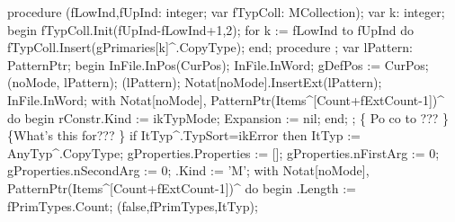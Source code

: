 \nwendcode{}\nwdocspar
\nwenddocs{}\endmoddef\nwstartdeflinemarkup{}\nwenddeflinemarkup
procedure (fLowInd,fUpInd: integer; var fTypColl: MCollection);
var
   k: integer;
begin
   fTypColl.Init(fUpInd-fLowInd+1,2);
   for k := fLowInd to fUpInd do
      fTypColl.Insert(gPrimaries[k]^.CopyType);
end;
\eatline
{}\nwendcode{}\nwdocspar
\nwenddocs{}\endmoddef\nwstartdeflinemarkup{}\nwenddeflinemarkup
procedure ;
var
   lPattern: PatternPtr;
begin
   InFile.InPos(CurPos);
   InFile.InWord;
   gDefPos := CurPos;
   (noMode, lPattern);
   (lPattern);
   Notat[noMode].InsertExt(lPattern);
   InFile.InWord;
   with Notat[noMode], PatternPtr(Items^[Count+fExtCount-1])^ do
   begin
      rConstr.Kind := ikTypMode;
      Expansion := nil;
   end;
   ;
   \{ Po co to ??? \} \{What's this for??? \}
   if ItTyp^.TypSort=ikError then ItTyp := AnyTyp^.CopyType;
   gProperties.Properties := [];
   gProperties.nFirstArg := 0;
   gProperties.nSecondArg := 0;
   .Kind := 'M';
   with Notat[noMode], PatternPtr(Items^[Count+fExtCount-1])^ do
   begin
      .Length := fPrimTypes.Count;
      (false,fPrimTypes,ItTyp);
